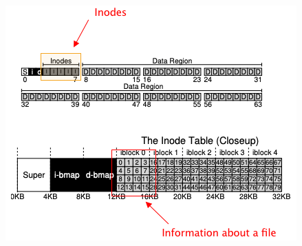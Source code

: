 \documentclass[12pt]{article}
\begin{document}
\begin{center}
\includegraphics[width=\linewidth]{../images/midterm_2_solution_23.png}
\end{center}
\end{document}
